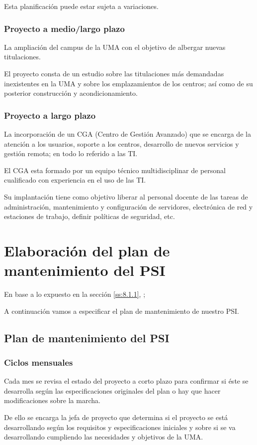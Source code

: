 \documentclass[11pt,a4paper,spanish,twoside]{report}
\begin{document}
Esta planificación puede estar sujeta a variaciones.

\subsubsection{Proyecto a medio/largo plazo}
La ampliación del campus de la UMA con el objetivo de albergar nuevas 
titulaciones.

El proyecto consta de un estudio sobre las titulaciones más demandadas 
inexistentes en la UMA y sobre los emplazamientos de los centros; así
como de su posterior construcción y acondicionamiento.

\subsubsection{Proyecto a largo plazo}
La incorporación de un CGA (Centro de Gestión Avanzado) que se encarga de la
atención a los usuarios, soporte a los centros, desarrollo de nuevos servicios 
y gestión remota; en todo lo referido a las TI.

El CGA esta formado por un equipo técnico multidisciplinar de personal 
cualificado con experiencia en el uso de las TI.

Su implantación tiene como objetivo liberar al personal docente de las tareas 
de administración, mantenimiento y configuración de servidores, electrónica de 
red y estaciones de trabajo, definir políticas de seguridad, etc.

\section{Elaboración del plan de mantenimiento del PSI}
En base a lo expuesto
en la sección \vref{ss:8.1.1}, \emph{}; 

A continuación vamos a especificar el plan de mantenimiento de nuestro PSI.
\subsection{Plan de mantenimiento del PSI}
\subsubsection{Ciclos mensuales}
Cada mes se revisa el estado del proyecto a corto plazo para confirmar si 
éste se desarrolla según las especificaciones originales del plan o hay que 
hacer modificaciones sobre la marcha.

De ello se encarga la jefa de proyecto que determina si el proyecto se está
desarrollando según los requisitos y especificaciones iniciales y sobre si se 
va desarrollando cumpliendo las necesidades y objetivos de la UMA.
\end{document}
